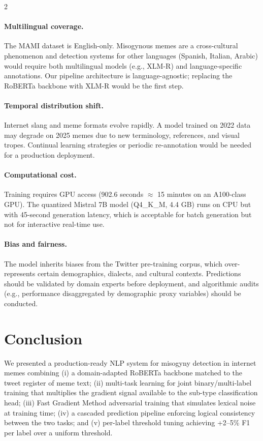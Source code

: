 \documentclass[11pt]{article}
\begin{document}
\begin{multicols}{2}
\paragraph{Multilingual coverage.}
The MAMI dataset is English-only. Misogynous memes are a cross-cultural phenomenon and detection systems for other languages (Spanish, Italian, Arabic) would require both multilingual models (e.g., XLM-R) and language-specific annotations. Our pipeline architecture is language-agnostic; replacing the RoBERTa backbone with XLM-R would be the first step.

\paragraph{Temporal distribution shift.}
Internet slang and meme formats evolve rapidly. A model trained on 2022 data may degrade on 2025 memes due to new terminology, references, and visual tropes. Continual learning strategies or periodic re-annotation would be needed for a production deployment.

\paragraph{Computational cost.}
Training requires GPU access (902.6 seconds $\approx$ 15 minutes on an A100-class GPU). The quantized Mistral 7B model (Q4\_K\_M, 4.4 GB) runs on CPU but with 45-second generation latency, which is acceptable for batch generation but not for interactive real-time use.

\paragraph{Bias and fairness.}
The model inherits biases from the Twitter pre-training corpus, which over-represents certain demographics, dialects, and cultural contexts. Predictions should be validated by domain experts before deployment, and algorithmic audits (e.g., performance disaggregated by demographic proxy variables) should be conducted.

\section{Conclusion}

We presented a production-ready NLP system for misogyny detection in internet memes combining (i) a domain-adapted RoBERTa backbone matched to the tweet register of meme text; (ii) multi-task learning for joint binary/multi-label training that multiplies the gradient signal available to the sub-type classification head; (iii) Fast Gradient Method adversarial training that simulates lexical noise at training time; (iv) a cascaded prediction pipeline enforcing logical consistency between the two tasks; and (v) per-label threshold tuning achieving +2–5\% F1 per label over a uniform threshold.


\end{multicols}
\end{document}

